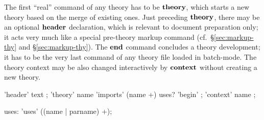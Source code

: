 The first ``real'' command of any theory has to be ${\mathord{\mathbf{theory}}}$, which starts a
new theory based on the merge of existing ones.  Just preceding ${\mathord{\mathbf{theory}}}$,
there may be an optional ${\mathord{\mathbf{header}}}$ declaration, which is relevant
to document preparation only; it acts very much like a special pre-theory
markup command (cf.\ \S\ref{sec:markup-thy} and \S\ref{sec:markup-thy}).  The
${\mathord{\mathbf{end}}}$ command concludes a theory development; it has to be the very last
command of any theory file loaded in batch-mode.  The theory context may be
also changed interactively by ${\mathord{\mathbf{context}}}$ without creating a new theory.

\begin{rail}
  'header' text
  ;
  'theory' name 'imports' (name +) uses? 'begin'
  ;
  'context' name
  ;

  uses: 'uses' ((name | parname) +);
\end{rail}

